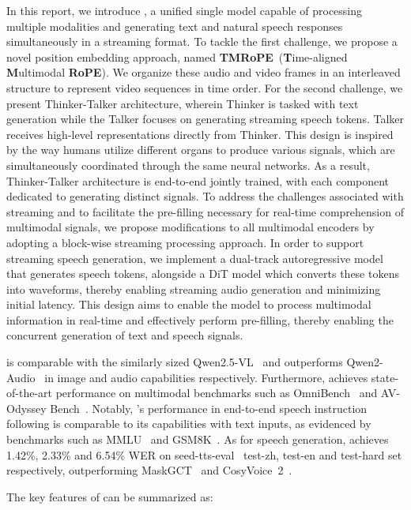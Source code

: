 In this report, we introduce \method, a unified single model capable of processing multiple modalities and generating text and natural speech responses simultaneously in a streaming format. To tackle the first challenge, we propose a novel position embedding approach, named \textbf{TMRoPE}~(\textbf{T}ime-aligned \textbf{M}ultimodal \textbf{RoPE}). We organize these audio and video frames in an interleaved structure to represent video sequences in time order. 
For the second challenge, we present Thinker-Talker architecture, wherein Thinker is tasked with text generation while the Talker focuses on generating streaming speech tokens. Talker receives high-level representations directly from Thinker. This design is inspired by the way humans utilize different organs to produce various signals, which are simultaneously coordinated through the same neural networks. As a result, Thinker-Talker architecture is end-to-end jointly trained, with each component dedicated to generating distinct signals.
To address the challenges associated with streaming and to facilitate the pre-filling necessary for real-time comprehension of multimodal signals, we propose modifications to all multimodal encoders by adopting a block-wise streaming processing approach. In order to support streaming speech generation, we implement a dual-track autoregressive model that generates speech tokens, alongside a DiT model which converts these tokens into waveforms, thereby enabling streaming audio generation and minimizing initial latency. This design aims to enable the model to process multimodal information in real-time and effectively perform pre-filling, thereby enabling the concurrent generation of text and speech signals. 

\method is comparable with the similarly sized Qwen2.5-VL~\citep{qwen2vl} and outperforms Qwen2-Audio~\citep{qwen2-audio} in image and audio capabilities respectively. Furthermore, \method achieves state-of-the-art performance on multimodal benchmarks such as OmniBench~\citep{li2024omnibench} and AV-Odyssey Bench~\citep{gong2024av}. Notably, \method's performance in end-to-end speech instruction following is comparable to its capabilities with text inputs, as evidenced by benchmarks such as MMLU~\citep{mmlu} and GSM8K~\citep{gsm8k}. As for speech generation, \method achieves 1.42\%, 2.33\% and 6.54\% WER on seed-tts-eval~\citep{seedtts} test-zh, test-en and test-hard set respectively, outperforming MaskGCT~\citep{maskgct} and CosyVoice~2~\citep{cosyvoice2}.

The key features of \method can be summarized as:

